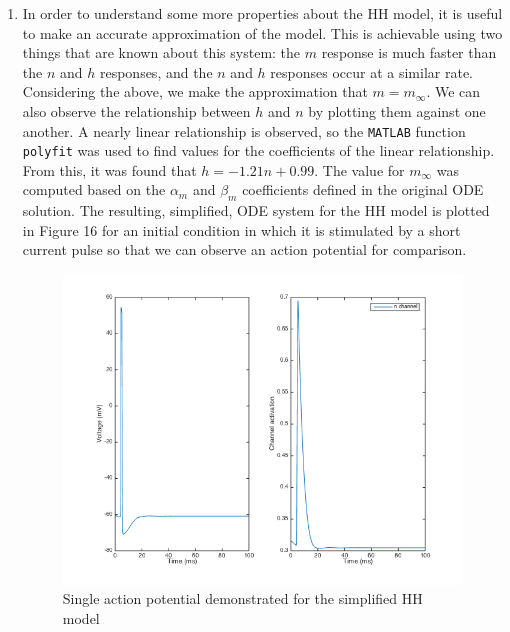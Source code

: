 \documentclass[10pt]{report}
\newcommand{\matlab}[1]{\texttt{#1}}
\begin{document}
\begin{enumerate}
%
%
\item In order to understand some more properties about the HH model, it is useful to make an accurate approximation of the model. This is achievable using two things that are known about this system: the $m$ response is much faster than the $n$ and $h$ responses, and the $n$ and $h$ responses occur at a similar rate. Considering the above, we make the approximation that $m = m_{\infty}$. We can also observe the relationship between $h$ and $n$ by plotting them against one another. A nearly linear relationship is observed, so the \matlab{MATLAB} function \matlab{polyfit} was used to find values for the coefficients of the linear relationship. From this, it was found that $h = -1.21n + 0.99$. The value for $m_{\infty}$ was computed based on the $\alpha_m$ and $\beta_m$ coefficients defined in the original ODE solution. The resulting, simplified, ODE system for the HH model is plotted in Figure 16 for an initial condition in which it is stimulated by a short current pulse so that we can observe an action potential for comparison. \begin{figure}[h!] \includegraphics[scale=0.4]{motnq18.png} \caption[h16]{Single action potential demonstrated for the simplified HH model} \end{figure}
%
%

\end{enumerate}
\end{document}
